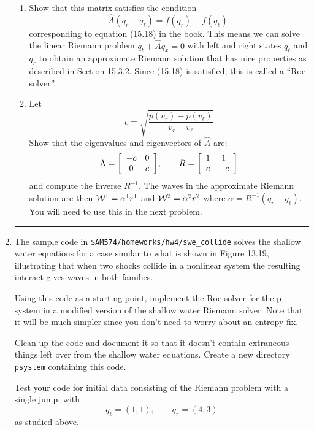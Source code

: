 \documentclass[11pt]{article}
\newenvironment{mat}{\left[ \begin{array}{ccccccccccccc}}{\end{array}\right]}
\newcommand\bcm{\begin{mat}}
\newcommand\ecm{\end{mat}}
\begin{document}
\begin{enumerate}
\begin{enumerate} 
\item Show that this matrix satisfies the condition 
\[
\hat A (q_r - q_\ell) = f(q_r) - f(q_\ell).
\]
corresponding to equation (15.18) in the book.  This means we can
solve the linear Riemann problem $q_t + \hat A q_x = 0$ with left and right
states $q_\ell$ and $q_r$ to obtain an approximate Riemann solution that has
nice properties as described in Section 15.3.2.  Since (15.18) is satisfied,
this is called a ``Roe solver''.

\item Let  
\[
c = \sqrt{\frac{p(v_r)-p(v_\ell)}{v_r - v_\ell}}
\]
Show that the eigenvalues and eigenvectors of $\hat A$ are:
\[
\Lambda = \bcm -c&0\\ 0&c\ecm, \qquad R = \bcm 1&1\\c&-c \ecm
\]
and compute the inverse $R^{-1}$.  The waves in the approximate Riemann
solution are then ${\cal W}^1 = \alpha^1 r^1$ and 
${\cal W}^2 = \alpha^2 r^2$ where $\alpha = R^{-1}(q_r - q_\ell)$.  You will
need to use this in the next problem.

\end{enumerate} 



\vskip 1cm
\hrule
\item

The sample code in \verb+$AM574/homeworks/hw4/swe_collide+ solves the
shallow water equations for a case similar to what is shown in Figure 13.19,
illustrating that when two shocks collide in a nonlinear system the
resulting interact gives waves in both families.

Using this code as a starting point, implement the Roe solver for the p-system 
in a modified version of the shallow water Riemann solver.  Note that it
will be much simpler since you don't need to worry about an entropy fix.

Clean up the code and document it so that it doesn't contain extraneous
things left over from the shallow water equations.  Create a new directory
\verb+psystem+ containing this code.

Test your code for initial data consisting of the Riemann problem with a
single jump, with 
\[
q_\ell = (1,1), \qquad q_r = (4,3)
\]
as studied above.  


\end{enumerate}
\end{document}
